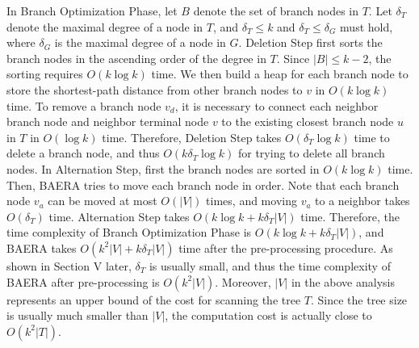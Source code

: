 \documentclass[conference]{IEEEtran}
\begin{document}
In Branch Optimization Phase, let $B$ denote the set of branch nodes in $T$.
Let $\delta _{T}$ denote the maximal degree of a node in $T$, and $\delta
_{T}\leq k$ and $\delta _{T}\leq \delta _{G}$ must hold, where $\delta _{G}$
is the maximal degree of a node in $G$. Deletion Step first sorts the branch
nodes in the ascending order of the degree in $T$. Since $|B|\leq k-2$, the
sorting requires $O(k\log k)$ time. We then build a heap for each branch node to store the
shortest-path distance from other branch nodes to $v$ in $O(k\log k)$ time. To
remove a branch node $v_{d}$, it is necessary to connect each neighbor
branch node and neighbor terminal node $v$ to the existing closest branch
node $u$ in $T$ in $O(\log k)$ time. Therefore, Deletion Step takes $O(\delta _{T}\log k)$ time to delete a branch node, and thus $O(k\delta _{T}\log k)$ for trying to delete all branch nodes. In Alternation Step, first the branch nodes are sorted in $O(k\log k)$ time.
Then, BAERA tries to move each branch node in order. Note that each branch node $v_{a}$ can be moved at most $O(|V|)$ times, and moving $v_{a}$ to a neighbor takes $O(\delta _{T})$ time. Alternation Step takes $O(k\log k+k\delta _{T}|V|)$ time. Therefore, the time
complexity of Branch Optimization Phase is $O(k\log k+k\delta _{T}|V|)$,
and BAERA takes $O(k^{2}|V|+k\delta _{T}|V|)$ time after the
pre-processing procedure. As shown in Section V later, $\delta _{T}$ is
usually small, and thus the time complexity of BAERA after pre-processing is $O(k^{2}|V|)$. Moreover, $|V|$ in the above analysis represents an upper bound of the cost for scanning the tree $T$. Since the tree size is usually much smaller than $|V|$, the computation cost is actually close to $O(k^2|T|)$.
\end{document}
